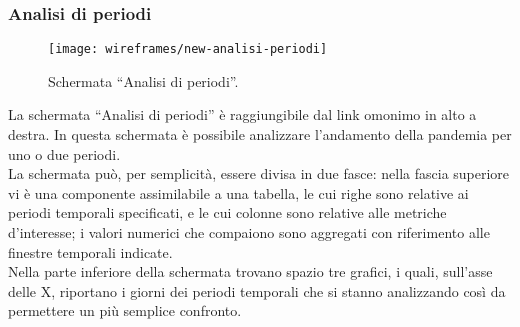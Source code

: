 \documentclass[../../../main.tex]{subfiles}
\begin{document}
\subsubsection{Analisi di periodi}\label{ss:analisi-di-periodi}
\begin{figure}[H]
    \centering
    \texttt{[image: wireframes/new-analisi-periodi]}
    \caption{Schermata ``Analisi di periodi''.}
    \label{fig:analisi-periodi}
\end{figure}
La schermata ``Analisi di periodi'' è raggiungibile dal link omonimo in alto a destra. In questa schermata è possibile analizzare l'andamento della pandemia per uno o due periodi.\\
La schermata può, per semplicità, essere divisa in due fasce: nella fascia superiore vi è una componente assimilabile a una tabella, le cui righe sono relative ai periodi temporali specificati, e le cui colonne sono relative alle metriche d'interesse; i valori numerici che compaiono sono aggregati con riferimento alle finestre temporali indicate.\\
Nella parte inferiore della schermata trovano spazio tre grafici, i quali, sull'asse delle X, riportano i giorni dei periodi temporali che si stanno analizzando così da permettere un più semplice confronto.
\clearpage
\end{document}
